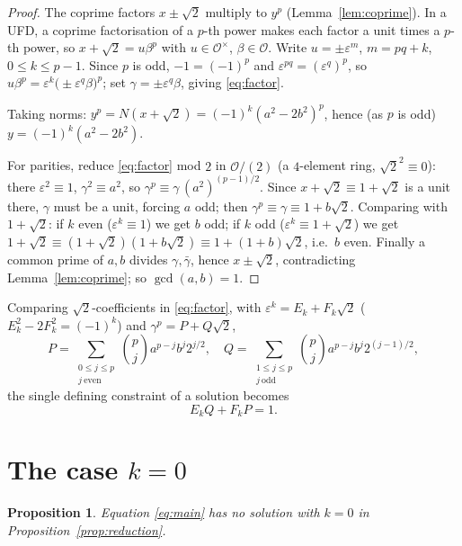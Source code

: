 \documentclass{amsart}
\newtheorem{proposition}{Proposition}
\theoremstyle{definition}
\begin{document}
\begin{proof}
The coprime factors $x\pm\sqrt2$ multiply to $y^p$
(Lemma~\ref{lem:coprime}). In a UFD, a coprime factorisation of a $p$-th power
makes each factor a unit times a $p$-th power, so $x+\sqrt2=u\beta^p$ with
$u\in\mathcal O^\times$, $\beta\in\mathcal O$. Write $u=\pm\varepsilon^m$,
$m=pq+k$, $0\le k\le p-1$. Since $p$ is odd, $-1=(-1)^p$ and
$\varepsilon^{pq}=(\varepsilon^q)^p$, so
$u\beta^p=\varepsilon^k\big(\pm\varepsilon^q\beta\big)^p$; set
$\gamma=\pm\varepsilon^q\beta$, giving \eqref{eq:factor}.

Taking norms: $y^p=N(x+\sqrt2)=(-1)^k(a^2-2b^2)^p$, hence (as $p$ is odd)
$y=(-1)^k(a^2-2b^2)$.

For parities, reduce \eqref{eq:factor} mod $2$ in $\mathcal O/(2)$ (a
$4$-element ring, $\sqrt2^2\equiv0$): there $\varepsilon^2\equiv1$,
$\gamma^2\equiv a^2$, so $\gamma^p\equiv\gamma\,(a^2)^{(p-1)/2}$. Since
$x+\sqrt2\equiv1+\sqrt2$ is a unit there, $\gamma$ must be a unit, forcing $a$
odd; then $\gamma^p\equiv\gamma\equiv1+b\sqrt2$. Comparing with $1+\sqrt2$:
if $k$ even ($\varepsilon^k\equiv1$) we get $b$ odd; if $k$ odd
($\varepsilon^k\equiv1+\sqrt2$) we get
$1+\sqrt2\equiv(1+\sqrt2)(1+b\sqrt2)\equiv1+(1+b)\sqrt2$, i.e.\ $b$ even.
Finally a common prime of $a,b$ divides $\gamma,\bar\gamma$, hence
$x\pm\sqrt2$, contradicting Lemma~\ref{lem:coprime}; so $\gcd(a,b)=1$.
\end{proof}

Comparing $\sqrt2$-coefficients in \eqref{eq:factor}, with
$\varepsilon^k=E_k+F_k\sqrt2$ ($E_k^2-2F_k^2=(-1)^k$) and
$\gamma^p=P+Q\sqrt2$,
\begin{equation}\label{eq:PQ}
P=\!\!\sum_{\substack{0\le j\le p\\ j\ \mathrm{even}}}\!\!\binom pj a^{p-j}b^{j}2^{j/2},
\quad
Q=\!\!\sum_{\substack{1\le j\le p\\ j\ \mathrm{odd}}}\!\!\binom pj a^{p-j}b^{j}2^{(j-1)/2},
\end{equation}
the single defining constraint of a solution becomes
\begin{equation}\label{eq:B}
E_kQ+F_kP=1 .
\end{equation}

\section{The case $k=0$}\label{sec:k0}

\begin{proposition}\label{prop:k0}
Equation \eqref{eq:main} has no solution with $k=0$ in
Proposition~\ref{prop:reduction}.
\end{proposition}
\end{document}

